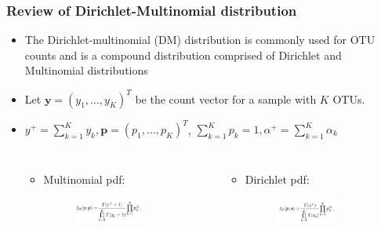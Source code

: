 \documentclass{beamer}
\begin{document}
\begin{frame}
\frametitle{Review of Dirichlet-Multinomial distribution}
\begin{itemize}
  \item The Dirichlet-multinomial (DM) distribution is commonly used for OTU counts and is a compound distribution comprised of Dirichlet and Multinomial distributions

  \item Let $\boldsymbol y = (y_1, \ldots , y_K)^T$ be the count vector for a sample with $K$ OTUs.

\item $y^+ = \sum_{k = 1}^K y_k, \boldsymbol p = (p_1, \ldots, p_K)^T$,  $\sum_{k = 1}^K p_k = 1, \alpha^+ = \sum_{k = 1}^K \alpha_k$
\begin{columns}[c] %

\begin{itemize}
  \item Multinomial pdf:
    \begin{figure}[!htb]
  	\includegraphics[width=0.65\textwidth]{img/multinomial_pdf.png}
    \end{figure}
\end{itemize}
\begin{itemize}
  \item Dirichlet pdf:
  \begin{figure}[!htb]
  	\includegraphics[width=0.65\textwidth]{img/dirichlet_pdf.png}
  \end{figure}
\end{itemize}
\end{columns}


\end{itemize}
\end{frame}
\end{document}
